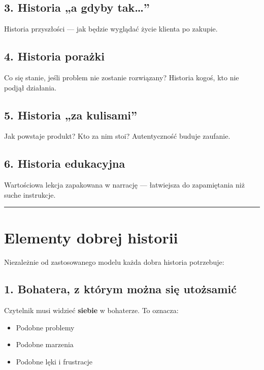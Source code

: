 \documentclass[
  12pt,
  a4paper,
  twoside,
  openright,
  12pt,
  DIV=12,
  BCOR=12mm]{scrbook}
\providecommand{\tightlist}{%
  \setlength{\itemsep}{0pt}\setlength{\parskip}{0pt}}\usepackage{longtable,booktabs,array}
\newcommand{\decoline}{%
  \begin{center}
    \textcolor{bordergray}{\rule{0.3\textwidth}{0.5pt}}
  \end{center}
}
\begin{document}
\subsection{3. Historia „a gdyby
tak\ldots''}\label{historia-a-gdyby-tak}

Historia przyszłości --- jak będzie wyglądać życie klienta po zakupie.

\subsection{4. Historia porażki}\label{historia-poraux17cki}

Co się stanie, jeśli problem nie zostanie rozwiązany? Historia kogoś,
kto nie podjął działania.

\subsection{5. Historia „za kulisami''}\label{historia-za-kulisami}

Jak powstaje produkt? Kto za nim stoi? Autentyczność buduje zaufanie.

\subsection{6. Historia edukacyjna}\label{historia-edukacyjna}

Wartościowa lekcja zapakowana w narrację --- łatwiejsza do zapamiętania
niż suche instrukcje.

\decoline

\section{Elementy dobrej historii}\label{elementy-dobrej-historii}

Niezależnie od zastosowanego modelu każda dobra historia potrzebuje:

\subsection{1. Bohatera, z którym można się
utożsamić}\label{bohatera-z-ktuxf3rym-moux17cna-siux119-utoux17csamiux107}

Czytelnik musi widzieć \textbf{siebie} w bohaterze. To oznacza:

\begin{itemize}
\tightlist
\item
  Podobne problemy
\item
  Podobne marzenia
\item
  Podobne lęki i frustracje
\end{itemize}
\end{document}
